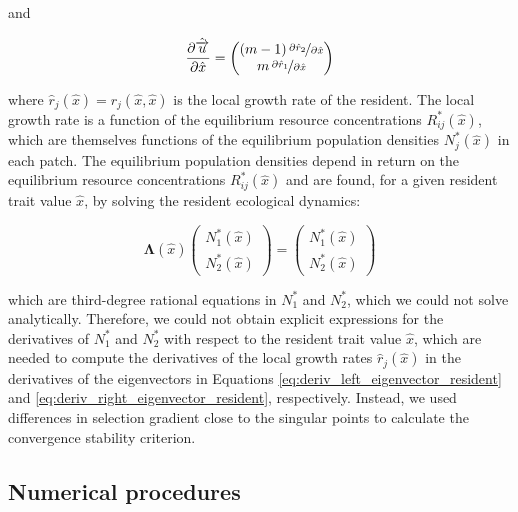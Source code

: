 and

\begin{equation}
    \frac{\partial \hat{\overrightarrow{u}} }{\partial \hat x} = 
    \begin{pmatrix}
        (m-1)\,\nicefrac{\partial \hat r_2}{\partial \hat x}\\
        m\,\nicefrac{\partial \hat r_1}{\partial \hat x}
    \end{pmatrix}
    \label{eq:deriv_right_eigenvector_resident}
\end{equation}

where $\hat r_j(\hat x) = r_j(\hat x, \hat x)$ is the local growth rate of the resident. The local growth rate is a function of the equilibrium resource concentrations $R^*_{ij}(\hat x)$, which are themselves functions of the equilibrium population densities $N^*_j(\hat x)$ in each patch. The equilibrium population densities depend in return on the equilibrium resource concentrations $R^*_{ij}(\hat x)$ and are found, for a given resident trait value $\hat x$, by solving the resident ecological dynamics:

\begin{equation}
    \pmb \Lambda(\hat x)
    \begin{pmatrix}
        N^*_1(\hat x)\\
        N^*_2(\hat x)
    \end{pmatrix}
    =
    \begin{pmatrix}
        N^*_1(\hat x)\\
        N^*_2(\hat x) 
    \end{pmatrix}
\end{equation}

which are third-degree rational equations in $N^*_1$ and $N^*_2$, which we could not solve analytically. Therefore, we could not obtain explicit expressions for the derivatives of $N^*_1$ and $N^*_2$ with respect to the resident trait value $\hat x$, which are needed to compute the derivatives of the local growth rates $\hat r_j(\hat x)$ in the derivatives of the eigenvectors in Equations \ref{eq:deriv_left_eigenvector_resident} and \ref{eq:deriv_right_eigenvector_resident}, respectively. Instead, we used differences in selection gradient close to the singular points to calculate the convergence stability criterion.

\subsection*{Numerical procedures}


